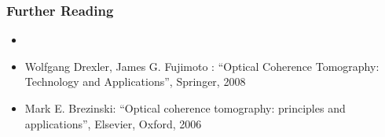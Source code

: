 \begin{frame}
    \frametitle{Further Reading}
    \begin{itemize}
        \setlength\itemsep{0.2cm}
        \item {}
        \item Wolfgang Drexler, James G. Fujimoto  : ``Optical Coherence Tomography: Technology and Applications'', Springer, 2008
        \item Mark E. Brezinski: ``Optical coherence tomography: principles and applications'', Elsevier, Oxford, 2006

    \end{itemize}
\end{frame}



